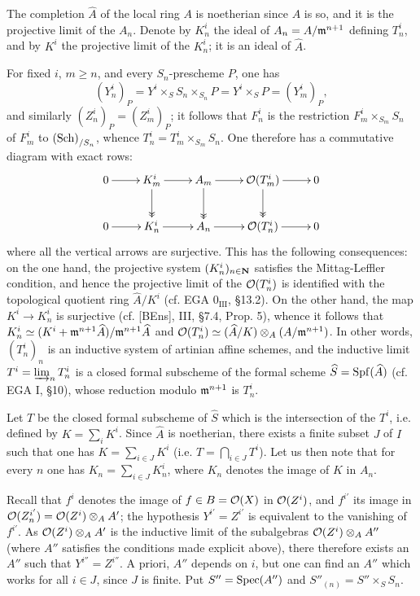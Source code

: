 The completion $\widehat A$ of the local ring $A$ is noetherian since $A$ is so, and it is the projective limit of the $A_n$. Denote by $K^i_n$ the ideal of $A_n=A/\mathfrak m^{n+1}$ defining $T^i_n$, and by $K^i$ the projective limit of the $K^i_n$; it is an ideal of $\widehat A$.

For fixed $i$, $m\geq n$, and every $S_n$-prescheme $P$, one has
\[
(Y^i_n)_P=Y^i\times_S S_n\times_{S_n}P=Y^i\times_S P=(Y^i_m)_P,
\]
and similarly $(Z^i_n)_P=(Z^i_m)_P$; it follows that $F^i_n$ is the restriction $F^i_m\times_{S_m}S_n$ of $F^i_m$ to $\textup{(Sch)}_{/S_n}$, whence $T^i_n=T^i_m\times_{S_m}S_n$. One therefore has a commutative diagram with exact rows:
\[
\xymatrix{0\ar[r]&K^i_m\ar[r]\ar@{->>}[d]&A_m\ar[r]\ar@{->>}[d]&\OO(T^i_m)\ar[r]\ar@{->>}[d]&0\\0\ar[r]&K^i_n\ar[r]&A_n\ar[r]&\OO(T^i_n)\ar[r]&0}
\]
where all the vertical arrows are surjective. This has the following consequences: on the one hand, the projective system $(K^i_n)_{n\in\mathbf{N}}$ satisfies the Mittag-Leffler condition, and hence the projective limit of the $\mathcal{O}(T^i_n)$ is identified with the topological quotient ring $\widehat A/K^i$ (cf. EGA $0_{\mathrm{III}}$, \S13.2). On the other hand, the map $K^i\to K^i_n$ is surjective (cf. [BEns], III, \S7.4, Prop. 5), whence it follows that $K^i_n\simeq(K^i+\mathfrak m^{n+1}\widehat A)/\mathfrak m^{n+1}\widehat A$ and $\mathcal{O}(T^i_n)\simeq(\widehat A/K)\otimes_A(A/\mathfrak m^{n+1})$.
In other words, $(T^i_n)_n$ is an inductive system of artinian affine schemes, and the inductive limit $T^i=\varinjlim_n T^i_n$ is a closed formal subscheme of the formal scheme $\widehat S=\operatorname{Spf}(\widehat A)$ (cf. EGA I, \S10), whose reduction modulo $\mathfrak m^{n+1}$ is $T^i_n$.

Let $T$ be the closed formal subscheme of $\widehat S$ which is the intersection of the $T^i$, i.e. defined by $K=\sum_i K^i$. Since $\widehat A$ is noetherian, there exists a finite subset $J$ of $I$ such that one has $K=\sum_{i\in J}K^i$ (i.e. $T=\bigcap_{i\in J}T^i$). Let us then note that for every $n$ one has $K_n=\sum_{i\in J}K^i_n$, where $K_n$ denotes the image of $K$ in $A_n$.

Recall that $f^i$ denotes the image of $f\in B=\mathcal{O}(X)$ in $\mathcal{O}(Z^i)$, and $f^{i'}$ its image in $\mathcal{O}(Z_n^{i'})=\mathcal{O}(Z^i)\otimes_A A'$; the hypothesis $Y^{i'}=Z^{i'}$ is equivalent to the vanishing of $f^{i'}$. As $\mathcal{O}(Z^i)\otimes_A A'$ is the inductive limit of the subalgebras $\mathcal{O}(Z^i)\otimes_A A''$ (where $A''$ satisfies the conditions made explicit above), there therefore exists an $A''$ such that $Y^{i''}=Z^{i''}$. A priori, $A''$ depends on $i$, but one can find an $A''$ which works for all $i\in J$, since $J$ is finite. Put $S''=\operatorname{Spec}(A'')$ and $S''_{(n)}=S''\times_S S_n$.

